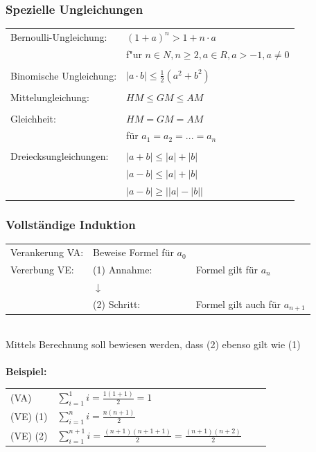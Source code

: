 			\subsubsection{Spezielle Ungleichungen}
			\begin{tabular}{ll} 
				Bernoulli-Ungleichung: & $(1 + a)^n > 1 + n \cdot a$\\
				& f"ur $n \in N, n \geq 2, a \in R, a > -1, a\neq0$ \\
				\\
				Binomische Ungleichung: & $|a\cdot b|\leq\frac{1}{2}(a^2 + b^2)$\\ 
				\\
				Mittelungleichung: & $ HM \leq GM \leq AM $\\
				\\
				
				Gleichheit: & $ HM = GM = AM$ \\
				& für $a_1 = a_2 = ... = a_n$ \\
				\\
				Dreiecksungleichungen: & $\left|a+b\right|\leq\left|a\right|+\left|b\right|$ \\
				 & 	$\left|a-b\right|\leq\left|a\right|+\left|b\right|$  \\
				 & $\left|a-b\right|\geq\left|\left|a\right|-\left|b\right|\right|$
			\end{tabular}
			
			
			\subsubsection{Vollständige Induktion}	
			\begin{tabular}{lll} 
			Verankerung VA: & Beweise Formel für $a_0$ & \\
			Vererbung VE: & (1) Annahme: & Formel gilt für $a_n$ \\
            & $\downarrow$ & \\
			& (2) Schritt: & Formel gilt auch für $a_{n+1}$ \\
			\end{tabular}
			\\
			
			Mittels Berechnung soll bewiesen werden, dass (2) ebenso gilt wie (1) \\	
			\\
			\textbf{Beispiel:} \\
			
			\begin{tabular}{llll} 
			(VA) & $\sum \limits_{i=1}^1 i = \frac{1(1+1)}{2} = 1 $ \\
			(VE) (1) & $\sum \limits_{i=1}^n i = \frac{n(n+1)}{2}$  \\
			(VE) (2) & $\sum \limits_{i=1}^{n+1} i = \frac{(n+1)(n+1 + 1)}{2} = \frac{(n+1)(n+2)}{2} $  \\
			\end{tabular}
			\\
			
